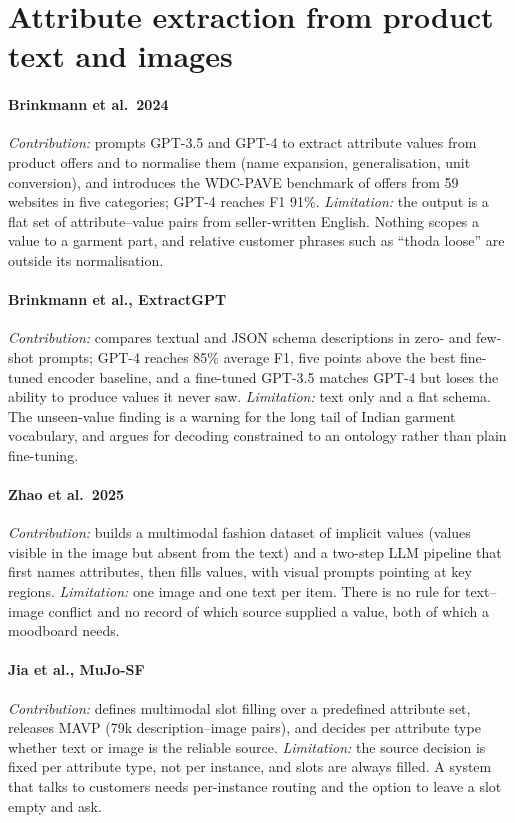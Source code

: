 \section{Attribute extraction from product text and images}

\paragraph{Brinkmann et al.\ 2024 \cite{brinkmann2024adbis}} \emph{Contribution:} prompts GPT-3.5 and GPT-4 to extract attribute values from product offers and to normalise them (name expansion, generalisation, unit conversion), and introduces the WDC-PAVE benchmark of offers from 59 websites in five categories; GPT-4 reaches F1 91\%. \emph{Limitation:} the output is a flat set of attribute--value pairs from seller-written English. Nothing scopes a value to a garment part, and relative customer phrases such as ``thoda loose'' are outside its normalisation.

\paragraph{Brinkmann et al., ExtractGPT \cite{brinkmann2024extractgpt}} \emph{Contribution:} compares textual and JSON schema descriptions in zero- and few-shot prompts; GPT-4 reaches 85\% average F1, five points above the best fine-tuned encoder baseline, and a fine-tuned GPT-3.5 matches GPT-4 but loses the ability to produce values it never saw. \emph{Limitation:} text only and a flat schema. The unseen-value finding is a warning for the long tail of Indian garment vocabulary, and argues for decoding constrained to an ontology rather than plain fine-tuning.

\paragraph{Zhao et al.\ 2025 \cite{zhao2025ave}} \emph{Contribution:} builds a multimodal fashion dataset of implicit values (values visible in the image but absent from the text) and a two-step LLM pipeline that first names attributes, then fills values, with visual prompts pointing at key regions. \emph{Limitation:} one image and one text per item. There is no rule for text--image conflict and no record of which source supplied a value, both of which a moodboard needs.

\paragraph{Jia et al., MuJo-SF \cite{jia2024mujo}} \emph{Contribution:} defines multimodal slot filling over a predefined attribute set, releases MAVP (79k description--image pairs), and decides per attribute type whether text or image is the reliable source. \emph{Limitation:} the source decision is fixed per attribute type, not per instance, and slots are always filled. A system that talks to customers needs per-instance routing and the option to leave a slot empty and ask.


